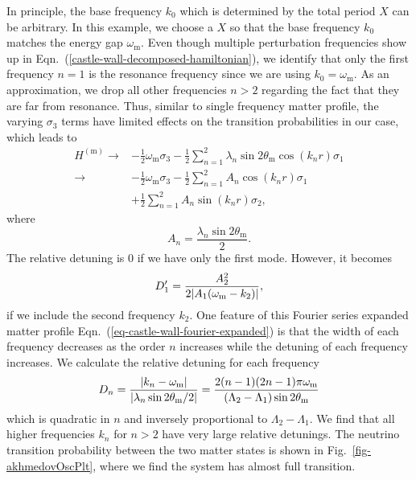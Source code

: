 In principle, the base frequency $k_0$ which is determined by the total period $X$ can be arbitrary. In this example, we choose a $X$ so that the base frequency $k_0$ matches the energy gap $\omega_{\mathrm{m}}$. Even though multiple perturbation frequencies show up in Eqn.~(\ref{castle-wall-decomposed-hamiltonian}), we identify that only the first frequency $n=1$ is the resonance frequency since we are using $k_0=\omega_{\mathrm{m}}$. As an approximation, we drop all other frequencies $n>2$ regarding the fact that they are far from resonance. Thus, similar to single frequency matter profile, the varying $\sigma_3$ terms have limited effects on the transition probabilities in our case, which leads to
\begin{align*}
    H^{(\mathrm m)} \to & - \frac{1}{2}\omega_{\mathrm m} \sigma_3  - \frac{1}{2} \sum_{n=1}^2\lambda_n \sin 2\theta_{\mathrm m}  \cos\left( k_n r \right) \sigma_1\\
    \to & - \frac{1}{2}\omega_{\mathrm m} \sigma_3  - \frac{1}{2} \sum_{n=1}^2 A_n \cos ( k_n r) \sigma_1 \\
    & + \frac{1}{2} \sum_{n=1}^2A_n \sin(k_n r) \sigma_2,
\end{align*}
where
\begin{equation*}
A_n = \frac{\lambda_n \sin 2\theta_{\mathrm m} }{2} .
\end{equation*}
The relative detuning is $0$ if we have only the first mode. However, it becomes
\begin{equation}
D_1'= \frac{A_2^2}{2\lvert A_1 (\omega_{\mathrm m} - k_2) \rvert},
\end{equation}
if we include the second frequency $k_2$. One feature of this Fourier series expanded matter profile Eqn.~(\ref{eq-castle-wall-fourier-expanded}) is that the width of each frequency decreases as the order $n$ increases while the detuning of each frequency increases. We calculate the relative detuning for each frequency
\begin{equation}
D_n = \frac{\lvert k_n -\omega_{\mathrm m} \rvert}{ \lvert \lambda_n  \sin 2\theta_{\mathrm m}/2 \rvert } = \frac{2(n-1)(2n-1)\pi \omega_{\mathrm m}}{(\Lambda_2 - \Lambda_1)\sin 2\theta_{\mathrm m}}
\end{equation}
which is quadratic in $n$ and inversely proportional to $\Lambda_2-\Lambda_1$. We find that all higher frequencies $k_n$ for $n>2$ have very large relative detunings. The neutrino transition probability between the two matter states is shown in Fig.~\ref{fig-akhmedovOscPlt}, where we find the system has almost full transition.

